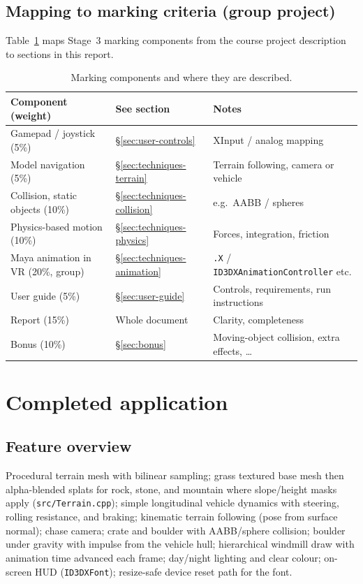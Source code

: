 \documentclass[11pt,a4paper]{article}
\begin{document}
\subsection{Mapping to marking criteria (group project)}
Table~\ref{tab:marking} maps Stage~3 marking components from the course project description to sections in this report.

\begin{table}[htbp]
  \centering
  \caption{Marking components and where they are described.}
  \label{tab:marking}
  \begin{tabular}{@{}lll@{}}
    \toprule
    \textbf{Component (weight)} & \textbf{See section} & \textbf{Notes} \\
    \midrule
    Gamepad / joystick (5\%) & \S\ref{sec:user-controls} & XInput / analog mapping \\
    Model navigation (5\%) & \S\ref{sec:techniques-terrain} & Terrain following, camera or vehicle \\
    Collision, static objects (10\%) & \S\ref{sec:techniques-collision} & e.g.\ AABB / spheres \\
    Physics-based motion (10\%) & \S\ref{sec:techniques-physics} & Forces, integration, friction \\
    Maya animation in VR (20\%, group) & \S\ref{sec:techniques-animation} & \texttt{.X} / \texttt{ID3DXAnimationController} etc. \\
    User guide (5\%) & \S\ref{sec:user-guide} & Controls, requirements, run instructions \\
    Report (15\%) & Whole document & Clarity, completeness \\
    Bonus (10\%) & \S\ref{sec:bonus} & Moving-object collision, extra effects, \ldots \\
    \bottomrule
  \end{tabular}
\end{table}

\section{Completed application}
\label{sec:application}

\subsection{Feature overview}
Procedural terrain mesh with bilinear sampling; grass textured base mesh then alpha-blended splats for rock, stone, and mountain where slope/height masks apply (\texttt{src/Terrain.cpp}); simple longitudinal vehicle dynamics with steering, rolling resistance, and braking; kinematic terrain following (pose from surface normal); chase camera; crate and boulder with AABB/sphere collision; boulder under gravity with impulse from the vehicle hull; hierarchical windmill draw with animation time advanced each frame; day/night lighting and clear colour; on-screen HUD (\texttt{ID3DXFont}); resize-safe device reset path for the font.
\end{document}
